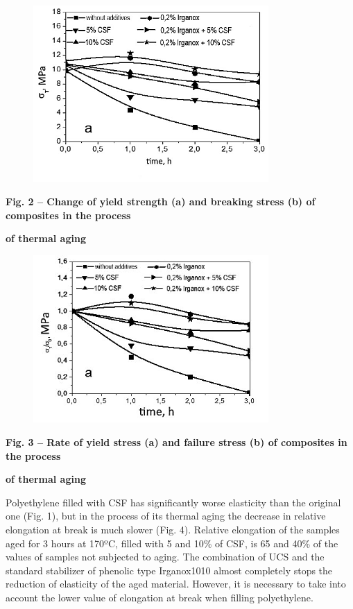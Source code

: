 \begin{figure}[H]
	\centering
	\includegraphics[width=0.8\textwidth]{media/chem/image20}
	\caption*{}
\end{figure}


{\bfseries Fig. 2 -- Change of yield strength (a) and breaking stress (b)
of composites in the process}

{\bfseries of thermal aging}

\begin{figure}[H]
	\centering
	\includegraphics[width=0.8\textwidth]{media/chem/image22}
	\caption*{}
\end{figure}


{\bfseries Fig. 3 -- Rate of yield stress (a) and failure stress (b) of
composites in the process}

{\bfseries of thermal aging}

Polyethylene filled with CSF has significantly worse elasticity than the
original one (Fig. 1), but in the process of its thermal aging the
decrease in relative elongation at break is much slower (Fig. 4).
Relative elongation of the samples aged for 3 hours at 170ºC, filled
with 5 and 10\% of CSF, is 65 and 40\% of the values of samples not
subjected to aging. The combination of UCS and the standard stabilizer
of phenolic type Irganox1010 almost completely stops the reduction of
elasticity of the aged material. However, it is necessary to take into
account the lower value of elongation at break when filling
polyethylene.

